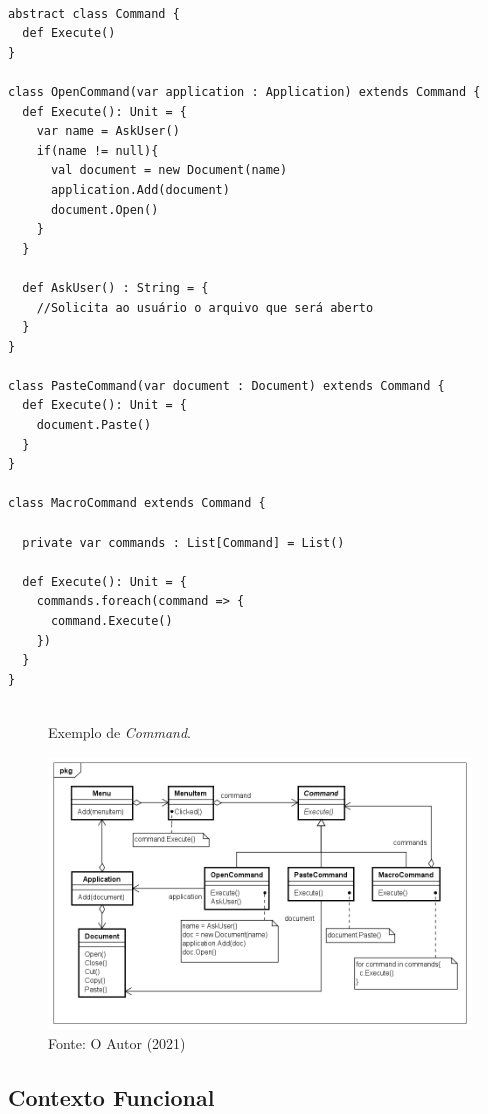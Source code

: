 \begin{lstlisting}[caption={\textit{Command} Orientação a Objetos.},label=oocommand]

abstract class Command {
  def Execute()
}

class OpenCommand(var application : Application) extends Command {
  def Execute(): Unit = {
    var name = AskUser()
    if(name != null){
      val document = new Document(name)
      application.Add(document)
      document.Open()
    }
  }

  def AskUser() : String = {
    //Solicita ao usuário o arquivo que será aberto
  }
}

class PasteCommand(var document : Document) extends Command {
  def Execute(): Unit = {
    document.Paste()
  }
}

class MacroCommand extends Command {

  private var commands : List[Command] = List()

  def Execute(): Unit = {
    commands.foreach(command => {
      command.Execute()
    })
  }
}
    
\end{lstlisting}

\begin{figure}[htb]
	\caption{\label{command_exemplo}Exemplo de \textit{Command}.}
	\begin{center}
	    \includegraphics[scale=0.5]{5_padroes-contexto-funcional/5.3_comportamentais/5.3.02_command/command_exemplo.png}
	\end{center}
  \caption*{Fonte: O Autor (2021)}
\end{figure}

\subsection*{Contexto Funcional}

